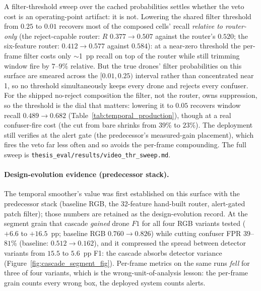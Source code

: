 A filter-threshold sweep over the cached probabilities settles whether the veto cost is an operating-point artifact: it is not. Lowering the shared filter threshold from $0.25$ to $0.01$ recovers most of the composed cells' recall \emph{relative to router-only} (the reject-capable router: $R$ $0.377 \to 0.507$ against the router's $0.520$; the six-feature router: $0.412 \to 0.577$ against $0.584$): at a near-zero threshold the per-frame filter costs only $\sim$1~pp recall on top of the router while still trimming window fire by $7$--$9\%$ relative. But the true drones' filter probabilities on this surface are smeared across the $[0.01, 0.25)$ interval rather than concentrated near 1, so no threshold simultaneously keeps every drone and rejects every confuser. For the shipped no-reject composition the filter, not the router, owns suppression, so the threshold is the dial that matters: lowering it to $0.05$ recovers window recall $0.489 \to 0.682$ (Table~\ref{tab:temporal_production}), though at a real confuser-fire cost (the cut from bare shrinks from $39\%$ to $23\%$). The deployment still verifies at the alert gate (the predecessor's measured-gain placement), which fires the veto far less often and so avoids the per-frame compounding. The full sweep is \texttt{thesis\_eval/results/video\_thr\_sweep.md}.

\paragraph{Design-evolution evidence (predecessor stack).}
The temporal smoother's value was first established on this surface with the predecessor stack (baseline RGB, the 32-feature hand-built router, alert-gated patch filter); those numbers are retained as the design-evolution record. At the segment grain that cascade \emph{gained} drone $F1$ for all four RGB variants tested ($+6.6$ to $+16.5$~pp; baseline RGB $0.760 \to 0.826$) while cutting confuser FPR $39$--$81\%$ (baseline: $0.512 \to 0.162$), and it compressed the spread between detector variants from $15.5$ to $5.6$~pp F1: the cascade absorbs detector variance (Figure~\ref{fig:cascade_segment_fig}). Per-frame metrics on the same runs \emph{fell} for three of four variants, which is the wrong-unit-of-analysis lesson: the per-frame grain counts every wrong box, the deployed system counts alerts.

